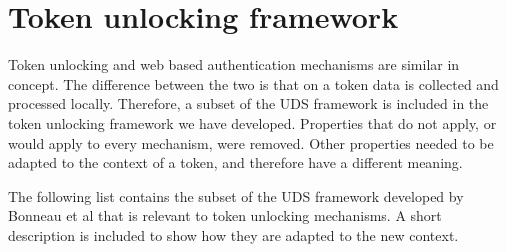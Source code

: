 \section{Token unlocking framework}
\label{tokenframework}
Token unlocking and web based authentication mechanisms are similar in concept. The difference between the two is that on a token data is collected and processed locally. Therefore, a subset of the UDS framework is included in the token unlocking framework we have developed. Properties that do not apply, or would apply to every mechanism, were removed. Other properties needed to be adapted to the context of a token, and therefore have a different meaning.

The following list contains the subset of the UDS framework developed by Bonneau et al \cite{bonneau2012quest} that is relevant to token unlocking mechanisms. A short description is included to show how they are adapted to the new context.
